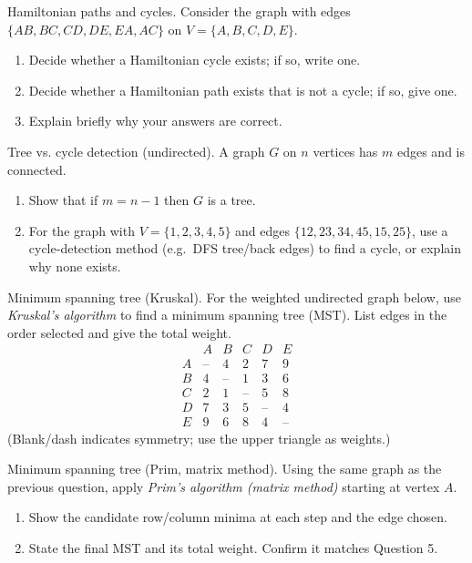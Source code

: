 \documentclass[11pt]{article}
\def\textbf#1{#1}%
\newcounter{question}
\begin{document}
\begin{question}
\textbf{Hamiltonian paths and cycles.}
Consider the graph with edges $\{AB,BC,CD,DE,EA,AC\}$ on $V=\{A,B,C,D,E\}$.
\begin{enumerate}
  \item Decide whether a Hamiltonian cycle exists; if so, write one.
  \item Decide whether a Hamiltonian path exists that is not a cycle; if so, give one.
  \item Explain briefly why your answers are correct.
\end{enumerate}
\end{question}

\begin{question}
\textbf{Tree vs. cycle detection (undirected).}
A graph $G$ on $n$ vertices has $m$ edges and is connected.
\begin{enumerate}
  \item Show that if $m=n-1$ then $G$ is a tree. 
  \item For the graph with $V=\{1,2,3,4,5\}$ and edges $\{12,23,34,45,15,25\}$, use a cycle-detection method (e.g.\ DFS tree/back edges) to find a cycle, or explain why none exists.
\end{enumerate}
\end{question}

\begin{question}
\textbf{Minimum spanning tree (Kruskal).}
For the weighted undirected graph below, use \emph{Kruskal’s algorithm} to find a minimum spanning tree (MST). List edges in the order selected and give the total weight.
\[
\begin{array}{c|ccccc}
  & A & B & C & D & E\\\hline
A & \text{--} & 4 & 2 & 7 & 9\\
B & 4 & \text{--} & 1 & 3 & 6\\
C & 2 & 1 & \text{--} & 5 & 8\\
D & 7 & 3 & 5 & \text{--} & 4\\
E & 9 & 6 & 8 & 4 & \text{--}
\end{array}
\]
(Blank/dash indicates symmetry; use the upper triangle as weights.)
\end{question}

\begin{question}
\textbf{Minimum spanning tree (Prim, matrix method).}
Using the same graph as the previous question, apply \emph{Prim’s algorithm (matrix method)} starting at vertex $A$.
\begin{enumerate}
  \item Show the candidate row/column minima at each step and the edge chosen.
  \item State the final MST and its total weight. Confirm it matches Question 5.
\end{enumerate}
\end{question}
\end{document}
